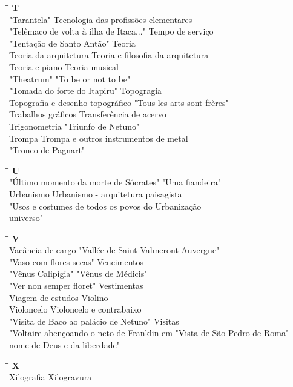 \begin{tabbing}
	\hspace{8,7cm}\=\hspace{1cm}\=\kill
	\textbf{T} \>  \\ 
	"Tarantela" \> Tecnologia das profissões elementares\\
	"Telêmaco de volta à ilha de Itaca..." \> Tempo de serviço\\
	"Tentação de Santo Antão"\> Teoria\\
	Teoria da arquitetura \> Teoria e filosofia da arquitetura\\ 
	Teoria e piano \>  Teoria musical\\ 
	"Theatrum" \> "To be or not to be"\\ 
	"Tomada do forte do Itapiru"  \> Topogragia\\
	Topografia e desenho topográfico \> "Tous les arts sont frères"\\
	Trabalhos gráficos \> Transferência de acervo\\
	Trigonometria \> "Triunfo de Netuno"\\
	Trompa \> Trompa e outros instrumentos de metal\\
	"Tronco de Pagnart" \> \\
\end{tabbing}

\begin{tabbing}
	\hspace{8,7cm}\=\hspace{1cm}\=\kill
	\textbf{U} \>  \\ 
	"Último momento da morte de Sócrates" \> "Uma fiandeira"\\
	Urbanismo \> Urbanismo - arquitetura paisagista\\
	"Usos e costumes de todos os povos do\> Urbanização\\
	universo" \> \\
\end{tabbing}

\begin{tabbing}
	\hspace{8,7cm}\=\hspace{1cm}\=\kill
	\textbf{V} \>  \\ 
    Vacância de cargo \> "Vallée de Saint Valmeront-Auvergne"\\
	"Vaso com flores secas" \> Vencimentos\\
	"Vênus Calipígia"\> "Vênus de Médicis"\\
	"Ver non semper floret" \> Vestimentas \\
	Viagem de estudos \> Violino\\
	Violoncelo \> Violoncelo e contrabaixo\\
	"Visita de Baco ao palácio de Netuno"\> Visitas\\
	"Voltaire abençoando o neto de Franklin em \> "Vista de São Pedro de Roma"\\
	nome de Deus e da liberdade" \> \\
\end{tabbing}

\begin{tabbing}
	\hspace{8,7cm}\=\hspace{1cm}\=\kill
	\textbf{X} \>  \\ 
	Xilografia \> Xilogravura\\
\end{tabbing}